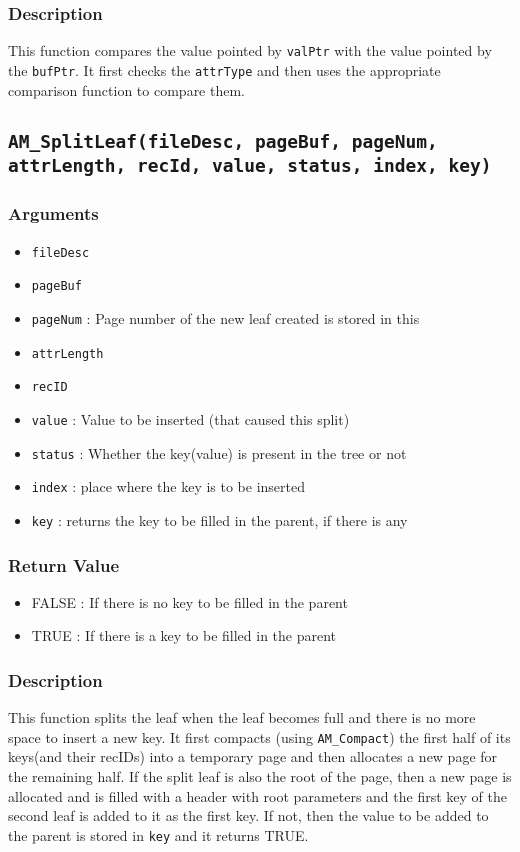 \documentclass[a4paper, 12pt]{article}
\begin{document}
\subsubsection{Description}
This function compares the value pointed by \texttt{valPtr} with the value pointed by the \texttt{bufPtr}. It first checks the \texttt{attrType} and then uses the appropriate comparison function to compare them.

\subsection{\texttt{AM\_SplitLeaf(fileDesc, pageBuf, pageNum, attrLength, recId, value, status, index, key)}}
\subsubsection{Arguments}
\begin{itemize}
	\item{\texttt{fileDesc}}
	\item{\texttt{pageBuf}}
	\item{\texttt{pageNum} : Page number of the new leaf created is stored in this}
	\item{\texttt{attrLength}}
	\item{\texttt{recID}}
	\item{\texttt{value} : Value to be inserted (that caused this split)}
	\item{\texttt{status} : Whether the key(value) is present in the tree or not}
	\item{\texttt{index} : place where the key is to be inserted}
	\item{\texttt{key} : returns the key to be filled in the parent, if there is any}
\end{itemize}
\subsubsection{Return Value}
\begin{itemize}
	\item{FALSE : If there is no key to be filled in the parent}
	\item{TRUE : If there is a key to be filled in the parent}
\end{itemize}
\subsubsection{Description}
This function splits the leaf when the leaf becomes full and there is no more space to insert a new key. It first compacts (using \texttt{AM\_Compact}) the first half of its keys(and their recIDs) into a temporary page and then allocates a new page for the remaining half. If the split leaf is also the root of the page, then a new page is allocated and is filled with a header with root parameters and the first key of the second leaf is added to it as the first key. If not, then the value to be added to the parent is stored in \texttt{key} and it returns TRUE.
\end{document}
